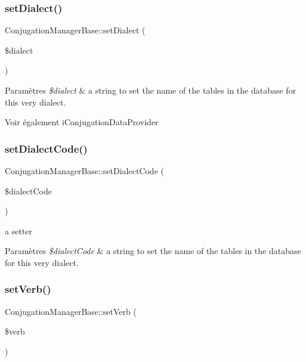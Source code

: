 \subsubsection{\texorpdfstring{set\+Dialect()}{setDialect()}}
{\footnotesize\ttfamily Conjugation\+Manager\+Base\+::set\+Dialect (\begin{DoxyParamCaption}\item[{}]{\$dialect }\end{DoxyParamCaption})}


\begin{DoxyParams}{Paramètres}
{\em \$dialect} & a string to set the name of the tables in the database for this very dialect. \\
\hline
\end{DoxyParams}
\begin{DoxySeeAlso}{Voir également}
i\+Conjugation\+Data\+Provider 
\end{DoxySeeAlso}
\hypertarget{classConjugationManagerBase_a98c6196247fa40cca8701324bdf36897}{}\label{classConjugationManagerBase_a98c6196247fa40cca8701324bdf36897} 
\subsubsection{\texorpdfstring{set\+Dialect\+Code()}{setDialectCode()}}
{\footnotesize\ttfamily Conjugation\+Manager\+Base\+::set\+Dialect\+Code (\begin{DoxyParamCaption}\item[{}]{\$dialect\+Code }\end{DoxyParamCaption})}



a setter 


\begin{DoxyParams}{Paramètres}
{\em \$dialect\+Code} & a string to set the name of the tables in the database for this very dialect. \\
\hline
\end{DoxyParams}
\hypertarget{classConjugationManagerBase_a36a53a9f0bc2114a5429bcf9e3cd351e}{}\label{classConjugationManagerBase_a36a53a9f0bc2114a5429bcf9e3cd351e} 
\subsubsection{\texorpdfstring{set\+Verb()}{setVerb()}}
{\footnotesize\ttfamily Conjugation\+Manager\+Base\+::set\+Verb (\begin{DoxyParamCaption}\item[{}]{\$verb }\end{DoxyParamCaption})}



